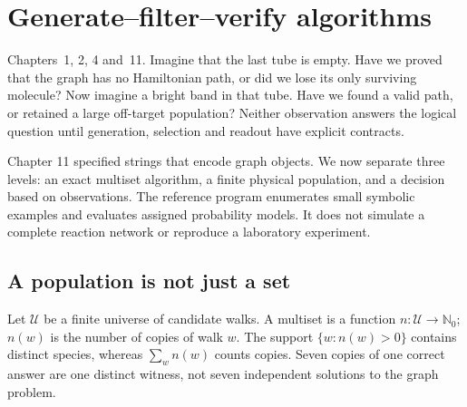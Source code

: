 \chapter{Generate--filter--verify algorithms}
{Chapters~1, 2, 4 and~11.}
Imagine that the last tube is empty. Have we proved that the graph has no
Hamiltonian path, or did we lose its only surviving molecule? Now imagine
a bright band in that tube. Have we found a valid path, or retained a large
off-target population? Neither observation answers the logical question until
generation, selection and readout have explicit contracts.

Chapter 11 specified strings that encode graph objects. We now separate
three levels: an exact multiset algorithm, a finite physical population,
and a decision based on observations. The reference program enumerates
small symbolic examples and evaluates assigned probability models. It does
not simulate a complete reaction network or reproduce a laboratory experiment.

\section{A population is not just a set}
Let $\mathcal U$ be a finite universe of candidate walks. A multiset is a
function $n:\mathcal U\to\mathbb N_0$; $n(w)$ is the number of copies of
walk $w$. The support $\{w:n(w)>0\}$ contains distinct species, whereas
$\sum_w n(w)$ counts copies. Seven copies of one correct answer are one
distinct witness, not seven independent solutions to the graph problem.

